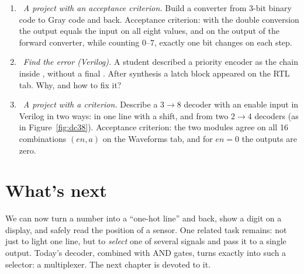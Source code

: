 \begin{taskbox}
\begin{enumerate}
  \item {}~\emph{A project with an acceptance criterion.} Build a converter from $3$-bit binary code to Gray code and back. Acceptance criterion: with the double conversion the output equals the input on all eight values, and on the output of the forward converter, while counting $0$--$7$, exactly one bit changes on each step.
  \item {}~\emph{Find the error (Verilog).} A student described a priority encoder as the chain  inside , without a final . After synthesis a latch block appeared on the RTL tab. Why, and how to fix it?
  \item {}~\emph{A project with a criterion.} Describe a $3\to8$ decoder with an enable input in Verilog in two ways: in one line with a shift, and from two $2\to4$ decoders (as in Figure~\ref{fig:dc38}). Acceptance criterion: the two modules agree on all 16 combinations $(en,a)$ on the Waveforms tab, and for $en=0$ the outputs are zero.
\end{enumerate}
\end{taskbox}

\section{What's next}

We can now turn a number into a ``one-hot line'' and back, show
a digit on a display, and safely read the position of a sensor. One
related task remains: not just to light one line, but to \emph{select} one of
several signals and pass it to a single output. Today's
decoder, combined with AND gates, turns exactly into such a
selector: a multiplexer. The next chapter is devoted to it.
